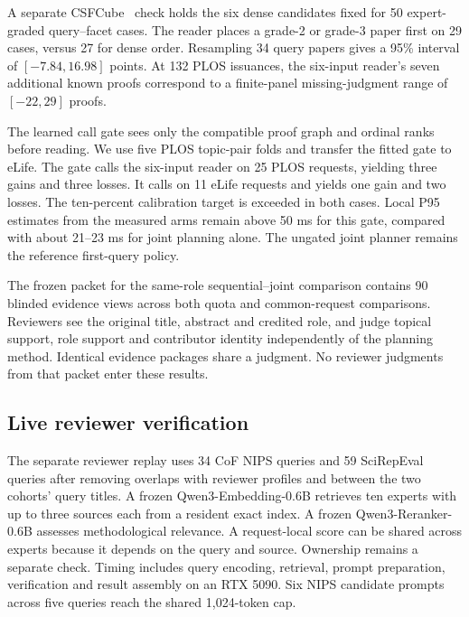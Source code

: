 A separate CSFCube~\cite{mysore2021csfcube} check holds the six dense candidates fixed for 50 expert-graded query--facet cases. The reader places a grade-2 or grade-3 paper first on 29 cases, versus 27 for dense order. Resampling 34 query papers gives a 95\% interval of $[-7.84,16.98]$ points. At 132 PLOS issuances, the six-input reader's seven additional known proofs correspond to a finite-panel missing-judgment range of $[-22,29]$ proofs.

The learned call gate sees only the compatible proof graph and ordinal ranks before reading. We use five PLOS topic-pair folds and transfer the fitted gate to eLife. The gate calls the six-input reader on 25 PLOS requests, yielding three gains and three losses. It calls on 11 eLife requests and yields one gain and two losses. The ten-percent calibration target is exceeded in both cases. Local P95 estimates from the measured arms remain above 50 ms for this gate, compared with about 21--23 ms for joint planning alone. The ungated joint planner remains the reference first-query policy.

The frozen packet for the same-role sequential--joint comparison contains 90 blinded evidence views across both quota and common-request comparisons. Reviewers see the original title, abstract and credited role, and judge topical support, role support and contributor identity independently of the planning method. Identical evidence packages share a judgment. No reviewer judgments from that packet enter these results.

\subsection{Live reviewer verification}
The separate reviewer replay uses 34 CoF NIPS queries and 59 SciRepEval queries after removing overlaps with reviewer profiles and between the two cohorts' query titles. A frozen Qwen3-Embedding-0.6B retrieves ten experts with up to three sources each from a resident exact index. A frozen Qwen3-Reranker-0.6B assesses methodological relevance. A request-local score can be shared across experts because it depends on the query and source. Ownership remains a separate check. Timing includes query encoding, retrieval, prompt preparation, verification and result assembly on an RTX 5090. Six NIPS candidate prompts across five queries reach the shared 1,024-token cap.

